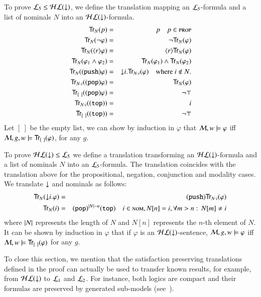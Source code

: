 \begin{pf}
To prove $\mathcal{L}_5 \le \mathcal{HL}({\downarrow})$, we define
the translation mapping an $\mathcal{L}_5$-formula and a list of
nominals $N$ into an $\mathcal{HL}({\downarrow})$-formula.
\begin{eqnarray*}
{\sf Tr}_N(p) & = & p \quad p \in \textsc{prop}\\
{\sf Tr}_N(\lnot \varphi) & = & \lnot {\sf Tr}_N(\varphi) \\
{\sf Tr}_N(\langle r \rangle \varphi) & = & \langle r \rangle {\sf Tr}_N(\varphi) \\
{\sf Tr}_N(\varphi_1 \land \varphi_2) & = & {\sf Tr}_N(\varphi_1) \land {\sf Tr}_N(\varphi_2)\\
{\sf Tr}_N({\tt (push)} \varphi) & = & {\downarrow} i. {\sf Tr}_{N\cdot i}(\varphi) \quad
\textrm{where $i \notin N$.}\\
{\sf Tr}_{N\cdot i}({\tt (pop)} \varphi) & = & {\sf Tr}_{N}(\varphi)\\
{\sf Tr}_{[\ ]}({\tt (pop)} \varphi) & = & \lnot\top\\
{\sf Tr}_{N\cdot i}({\tt (top)}) & = & i\\
{\sf Tr}_{[\ ]}({\tt (top)}) & = & \lnot\top
\end{eqnarray*}
Let $[\ ]$ be the empty list, we can show
by induction in $\varphi$ that $\mathcal{M}, w \models
\varphi$ iff $\mathcal{M}, g, w \models {\sf Tr}_{[\ ]}(\varphi)$, for any $g$.
\smallskip

\noindent
To prove $\mathcal{HL}({\downarrow}) \le \mathcal{L}_5$ we define a translation transforming an
$\mathcal{HL}({\downarrow})$-formula and a list of nominals $N$ into an $\mathcal{L}_5$-formula.
The translation coincides with the translation above for the propositional, negation,
conjunction and modality cases. We translate ${\downarrow}$ and nominals as follows:
\begin{eqnarray*}
{\sf Tr}_N({\downarrow} i.\varphi) & = & {\tt (push)}{\sf Tr}_{N\cdot i}(\varphi)\\
{\sf Tr}_N(i) & = & {\tt (pop)}^{|N|-n}{\tt (top)} \quad i \in \textsc{nom}, N[n]=i,
\forall m>n:\, N[m]\not=i
\end{eqnarray*}
where $|N|$ represents the length of $N$ and $N[n]$ represents the $n$-th element
of $N$.
It can be shown by induction in $\varphi$ that if $\varphi$ is an
$\mathcal{HL}({\downarrow})$-sentence, $\mathcal{M}, g, w \models
\varphi$ iff $\model, w \models \Tr_{[\ ]}(\varphi)$ for any $g$.
\end{pf}

To close this section, we mention that the satisfaction preserving translations defined in
the proof can actually be used to transfer known results, for example, from  $\mathcal{HL}({\downarrow})$ to $\mathcal{L}_1$ and $\mathcal{L}_2$.  For
instance, both logics are compact and their formulas are preserved by generated sub-models (see~\cite{areces01:_hybrid}).
